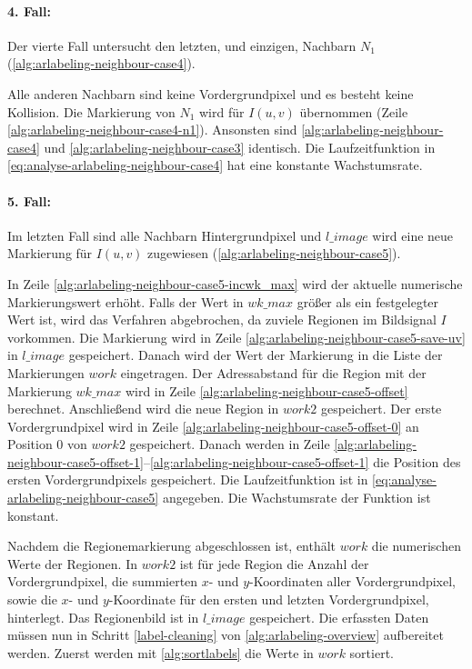 \paragraph{4. Fall:} %
\label{par:fall_4_}
Der vierte Fall untersucht den letzten, und einzigen, Nachbarn $N_1$ (\autoref{alg:arlabeling-neighbour-case4}).

Alle anderen Nachbarn sind keine Vordergrundpixel und es besteht keine Kollision. Die Markierung von $N_1$ wird für
 $I(u,v)$ übernommen (Zeile \ref{alg:arlabeling-neighbour-case4-n1}). Ansonsten sind
 \autoref{alg:arlabeling-neighbour-case4} und \autoref{alg:arlabeling-neighbour-case3} identisch. Die Laufzeitfunktion
 in \autoref{eq:analyse-arlabeling-neighbour-case4} hat eine konstante Wachstumsrate.


\paragraph{5. Fall:} %
\label{par:fall_5_}
Im letzten Fall sind alle Nachbarn Hintergrundpixel und $\mathit{l\_image}$ wird eine neue Markierung für $I(u,v)$
 zugewiesen (\autoref{alg:arlabeling-neighbour-case5}).

In Zeile \ref{alg:arlabeling-neighbour-case5-incwk_max} wird der aktuelle numerische Markierungswert erhöht. Falls der
 Wert in $\mathit{wk\_max}$ größer als ein festgelegter Wert ist, wird das Verfahren abgebrochen, da zuviele Regionen
 im Bildsignal $I$ vorkommen. Die Markierung wird in Zeile \ref{alg:arlabeling-neighbour-case5-save-uv} in
 $\mathit{l\_image}$ gespeichert. Danach wird der Wert der Markierung in die Liste der Markierungen $\mathit{work}$
 eingetragen. Der Adressabstand für die Region mit der Markierung $\mathit{wk\_max}$ wird in Zeile
 \ref{alg:arlabeling-neighbour-case5-offset} berechnet. Anschließend wird die neue Region in $\mathit{work2}$
 gespeichert. Der erste Vordergrundpixel wird in Zeile \ref{alg:arlabeling-neighbour-case5-offset-0} an Position $0$
 von $\mathit{work2}$ gespeichert. Danach werden in Zeile
 \ref{alg:arlabeling-neighbour-case5-offset-1}--\ref{alg:arlabeling-neighbour-case5-offset-1} die Position des ersten
 Vordergrundpixels gespeichert. Die Laufzeitfunktion ist in \autoref{eq:analyse-arlabeling-neighbour-case5} angegeben.
 Die Wachstumsrate der Funktion ist konstant.


Nachdem die Regionemarkierung abgeschlossen ist, enthält $\mathit{work}$ die numerischen Werte der Regionen. In
 $\mathit{work2}$ ist für jede Region die Anzahl der Vordergrundpixel, die summierten $x$- und $y$-Koordinaten aller
 Vordergrundpixel, sowie die $x$- und $y$-Koordinate für den ersten und letzten Vordergrundpixel, hinterlegt. Das
 Regionenbild ist in $\mathit{l\_image}$ gespeichert. Die erfassten Daten müssen nun in Schritt \ref{label-cleaning} von
 \autoref{alg:arlabeling-overview} aufbereitet werden. Zuerst werden mit \autoref{alg:sortlabels} die Werte
 in $\mathit{work}$ sortiert.

